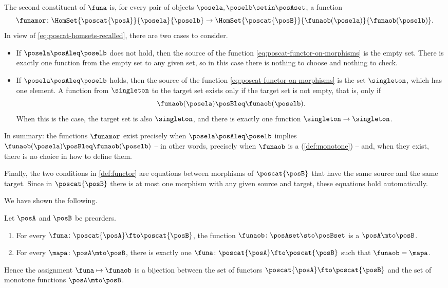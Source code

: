 The second constituent of $\funa$ is, for every pair of objects $\posela, \poselb \setin \posAset$, a function
\begin{equation}
    \label{eq:poscat-functor-on-morphisms}
    \funamor \colon \HomSet{\poscat{\posA}}{\posela}{\poselb} \to \HomSet{\poscat{\posB}}{\funaob(\posela)}{\funaob(\poselb)}.
\end{equation}
In view of \cref{eq:poscat-homsets-recalled}, there are two cases to consider.
\begin{itemize}
    \item If $\posela \posAleq \poselb$ does not hold, then the source of the function \cref{eq:poscat-functor-on-morphisms} is the empty set.
          There is exactly one function from the empty set to any given set, so in this case there is nothing to choose and nothing to check.
    \item If $\posela \posAleq \poselb$ holds, then the source of the function \cref{eq:poscat-functor-on-morphisms} is the set $\singleton$, which has one element.
          A function from $\singleton$ to the target set exists only if the target set is not empty, that is, only if
          \begin{equation}
              \funaob(\posela) \posBleq \funaob(\poselb).
          \end{equation}
          When this is the case, the target set is also $\singleton$, and there is exactly one function $\singleton \to \singleton$.
\end{itemize}
In summary: the functions $\funamor$ exist precisely when $\posela \posAleq \poselb$ implies $\funaob(\posela) \posBleq \funaob(\poselb)$ -- in other words, precisely when $\funaob$ is a  (\cref{def:monotone}) -- and, when they exist, there is no choice in how to define them.

Finally, the two conditions in \cref{def:functor} are equations between morphisms of $\poscat{\posB}$ that have the same source and the same target.
Since in $\poscat{\posB}$ there is at most one morphism with any given source and target, these equations hold automatically.

We have shown the following.

\begin{lemma}
    \label{lem:posetfunctor}
    Let $\posA$ and $\posB$ be preorders.
    \begin{enumerate}
        \item For every  $\funa \colon \poscat{\posA} \fto \poscat{\posB}$, the function $\funaob \colon \posAset \sto \posBset$ is a  $\posA \mto \posB$.
        \item For every  $\mapa \colon \posA \mto \posB$, there is exactly one  $\funa \colon \poscat{\posA} \fto \poscat{\posB}$ such that $\funaob = \mapa$.
    \end{enumerate}
    Hence the assignment $\funa \mapsto \funaob$ is a bijection between the set of functors $\poscat{\posA} \fto \poscat{\posB}$ and the set of monotone functions $\posA \mto \posB$.
\end{lemma}

